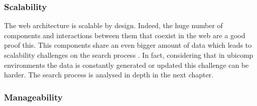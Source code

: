 \subsubsection{Scalability}

The web architecture is scalable by design.
Indeed, the huge number of components and interactions between them that coexist in the web are a good proof this.
This components share an even bigger amount of data which leads to scalability challenges on the search process \citep{krummenacher_scalability_2008}. %
In fact, considering that in \ac{ubicomp} environments the data is constantly generated or updated this challenge can be harder.
The search process is analysed in depth in the next chapter.





\subsubsection{Manageability}

